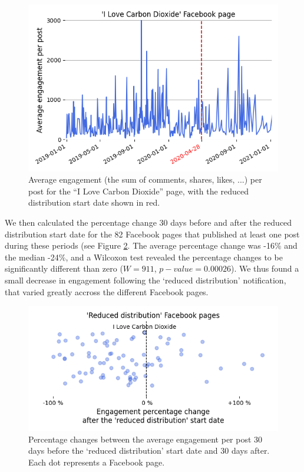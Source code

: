 \documentclass[11pt,a4paper]{article}
\begin{document}
\begin{figure}[!h]
\centering
\includegraphics[width=\linewidth]{./../figure/reduce_example_timeseries.png}
\caption{Average engagement (the sum of comments, shares, likes, ...) per post for the “I Love Carbon Dioxide” page, with the reduced distribution start date shown in red.}
\label{reduce_example_timeseries}
\end{figure}

We then calculated the percentage change 30 days before and after the reduced distribution start date for the 82 Facebook pages that published at least one post during these periods (see Figure \ref{reduce_percentage_change}. 
The average percentage change was -16\% and the median -24\%, and a Wilcoxon test revealed the percentage changes to be significantly different than zero ($W = 911$, $p-value = 0.00026$).
We thus found a small decrease in engagement following the `reduced distribution' notification, that varied greatly accross the different Facebook pages.

\begin{figure}[!h]
\centering
\includegraphics[width=\linewidth]{./../figure/reduce_percentage_change.png}
\caption{Percentage changes between the average engagement per post 30 days before the `reduced distribution' start date and 30 days after. Each dot represents a Facebook page.}
\label{reduce_percentage_change}
\end{figure}
 
\end{document}
